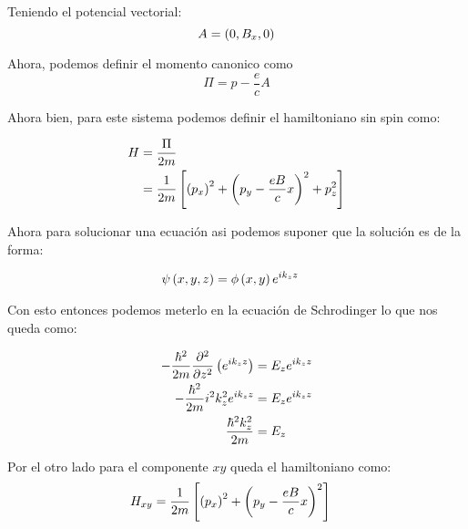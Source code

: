 \documentclass{report}
\begin{document}
\section{}

\section{}

\chapter{}

\section{}

Teniendo el potencial vectorial:
\[
  A = \left(0, B_x, 0\right)
\]

Ahora, podemos definir el momento canonico como
\[
  \Pi = p - \frac{e}{c}A
\]

Ahora bien, para este sistema podemos definir el hamiltoniano sin spin como:

\begin{align*}
  H &= \frac{\Pi}{2m}\\
  &= \frac{1}{2m} \left[\left(p_x\right)^2 + \left(p_y - \frac{eB}{c}x\right)^2 + p_z^2\right]
\end{align*}

Ahora para solucionar una ecuación asi podemos suponer que la solución es de la forma:

\begin{align*}
  \psi\left(x, y, z\right) &= \phi\left(x, y\right)e^{ik_zz}
\end{align*}

Con esto entonces podemos meterlo en la ecuación de Schrodinger lo que nos queda como:

\begin{align*}
  -\frac{\hbar^2}{2m}\frac{\partial^2}{\partial z^2} \left(e^{ik_zz}\right) &= E_z e^{ik_zz}\\
  -\frac{\hbar^2}{2m}i^2k_z^2 e^{ik_zz} &= E_z e^{ik_zz}\\
  \frac{\hbar^2k_z^2}{2m} &= E_z
\end{align*}

Por el otro lado para el componente $xy$ queda el hamiltoniano como:
\begin{align*}
  H_{xy} &= \frac{1}{2m} \left[\left(p_x\right)^2 + \left(p_y - \frac{eB}{c}x\right)^2\right]
\end{align*}
\end{document}

